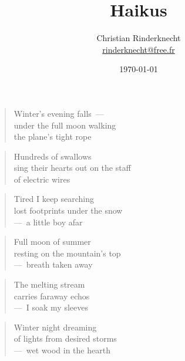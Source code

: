 \documentclass[a4paper,12pt]{article}
\title{Haikus}
\author{Christian Rinderknecht\\
{\small \url{rinderknecht@free.fr}}}
\date{\today}
\begin{document}
\begin{verse}
  Winter's evening falls~--- \\
  under the full moon walking \\
  the plane's tight rope
\end{verse}

\begin{verse}
  Hundreds of swallows \\
  sing their hearts out on the staff \\
  of electric wires
\end{verse}

\begin{verse}
  Tired I keep searching \\
  lost footprints under the snow \\
  ---~a little boy afar
\end{verse}

\begin{verse}
  Full moon of summer \\
  resting on the mountain's top \\
  ---~breath taken away
\end{verse}

\begin{verse}
  The melting stream \\
  carries faraway echos \\
  ---~I soak my sleeves
\end{verse}

\begin{verse}
  Winter night dreaming \\
  of lights from desired storms \\
  ---~wet wood in the hearth
\end{verse}
\end{document}
